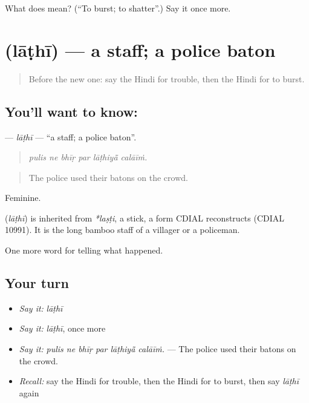 \begin{tcolorbox}[breakable,colback=teal!4,colframe=teal!35!black,title={Before you move on}]
What does  mean? (\textquotedblleft{}To burst; to shatter\textquotedblright{}.) Say it once more.
\end{tcolorbox}
\section[\texorpdfstring{\hi{लाठी} (lāṭhī)}{लाठी (lāṭhī)}]{ (lāṭhī) — a staff; a police baton}

\label{lesson:HI-C316-lathi}



\begin{quote}
Before the new one: say the Hindi for trouble, then the Hindi for to burst.
\end{quote}

\subsection*{You'll want to know: }
\textbf{} — \emph{lāṭhī} — \textquotedblleft{}a staff; a police baton\textquotedblright{}.

\begin{quote}
     
\end{quote}

\begin{quote}
\emph{pulis ne bhīṛ par lāṭhiyā̃ calāīṁ.}
\end{quote}

\begin{quote}
The police used their batons on the crowd.
\end{quote}

Feminine.

\begin{cousinweb}
\textbf{} (\emph{lāṭhī}) is inherited from \emph{*laṣṭi}, a stick, a form CDIAL reconstructs (CDIAL 10991). It is the long bamboo staff of a villager or a policeman.
\end{cousinweb}

\begin{grammarlens}[title={What you've built}]
One more word for telling what happened.
\end{grammarlens}

\subsection*{Your turn}
\begin{itemize}
\raggedright
  \item \emph{Say it:} \emph{lāṭhī}
  \item \emph{Say it:} \emph{lāṭhī}, once more
  \item \emph{Say it:} \emph{pulis ne bhīṛ par lāṭhiyā̃ calāīṁ.} — The police used their batons on the crowd.
  \item \emph{Recall:} say the Hindi for trouble, then the Hindi for to burst, then say \emph{lāṭhī} again
\end{itemize}


